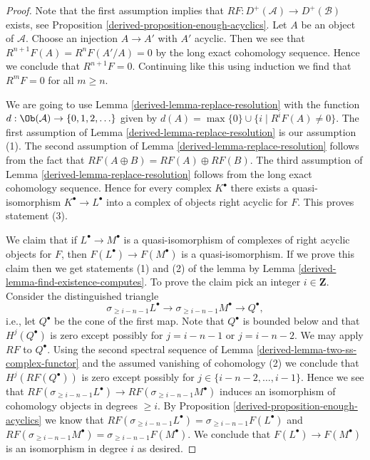 \begin{proof}

Note that the first assumption implies that
$RF : D^+(\mathcal{A}) \to D^+(\mathcal{B})$ exists, see
Proposition \ref{derived-proposition-enough-acyclics}.
Let $A$ be an object of $\mathcal{A}$. Choose an injection $A \to A'$
with $A'$ acyclic. Then we see that $R^{n + 1}F(A) = R^nF(A'/A) = 0$ by
the long exact cohomology sequence. Hence we conclude that $R^{n + 1}F = 0$.
Continuing like this using induction we find that $R^mF = 0$ for all
$m \geq n$.

\medskip\noindent
We are going to use Lemma \ref{derived-lemma-replace-resolution} with the function
$d : \Ob(\mathcal{A}) \to \{0, 1, 2, \ldots \}$ given by
$d(A) = \max \{0\} \cup \{i \mid R^iF(A) \not = 0\}$.
The first assumption of Lemma \ref{derived-lemma-replace-resolution}
is our assumption (1). The second assumption of
Lemma \ref{derived-lemma-replace-resolution} follows from the fact
that $RF(A \oplus B) = RF(A) \oplus RF(B)$. The third assumption of
Lemma \ref{derived-lemma-replace-resolution} follows from the long exact
cohomology sequence. Hence for every complex $K^\bullet$ there exists a
quasi-isomorphism $K^\bullet \to L^\bullet$ into a complex of
objects right acyclic for $F$. This proves statement (3).

\medskip\noindent
We claim that if $L^\bullet \to M^\bullet$ is a quasi-isomorphism of
complexes of right acyclic objects for $F$, then
$F(L^\bullet) \to F(M^\bullet)$
is a quasi-isomorphism. If we prove this claim then we get statements
(1) and (2) of the lemma by
Lemma \ref{derived-lemma-find-existence-computes}.
To prove the claim pick an integer $i \in \mathbf{Z}$.
Consider the distinguished triangle
$$
\sigma_{\geq i - n - 1}L^\bullet \to
\sigma_{\geq i - n - 1}M^\bullet \to Q^\bullet,
$$
i.e., let $Q^\bullet$ be the cone of the first map.
Note that $Q^\bullet$ is bounded below and that
$H^j(Q^\bullet)$ is zero except possibly for $j = i - n - 1$
or $j = i - n - 2$. We may apply $RF$ to $Q^\bullet$.
Using the second spectral sequence of
Lemma \ref{derived-lemma-two-ss-complex-functor}
and the assumed vanishing of cohomology (2) we conclude
that $H^j(RF(Q^\bullet))$ is zero except possibly for
$j \in \{i - n - 2, \ldots, i - 1\}$. Hence we see that
$RF(\sigma_{\geq i - n - 1}L^\bullet) \to RF(\sigma_{\geq i - n - 1}M^\bullet)$
induces an isomorphism of cohomology objects in degrees $\geq i$.
By Proposition \ref{derived-proposition-enough-acyclics} we know that
$RF(\sigma_{\geq i - n - 1}L^\bullet) = \sigma_{\geq i - n - 1}F(L^\bullet)$
and
$RF(\sigma_{\geq i - n - 1}M^\bullet) = \sigma_{\geq i - n - 1}F(M^\bullet)$.
We conclude that $F(L^\bullet) \to F(M^\bullet)$
is an isomorphism in degree $i$ as desired.


\end{proof}
